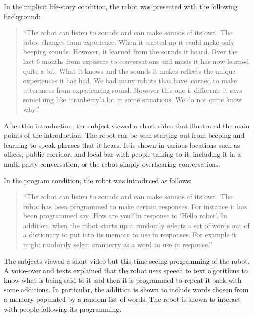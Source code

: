 In the implicit life-story condition, the robot was presented with the following background: 

\begin{quotation}

``The robot can listen to sounds and can make sounds of its own. The robot changes from experience. When it started up it could make only beeping sounds. However, it learned from the sounds it heard. Over the last 6 months from exposure to conversations and music it has now learned quite a bit. What it knows and the sounds it makes reflects the unique experiences it has had. We had many robots that have learned to make utterances from experiencing sound. However this one is different: it says something like \lq cranberry\rq a lot in some situations. We do not quite know why.'' 

\end{quotation}

After this introduction, the subject viewed a short video that illustrated the main points of the introduction. The robot can be seen starting out from beeping and learning to speak phrases that it hears. It is shown in various locations such as offices, public corridor, and local bar with people talking to it, including it in a multi-party conversation, or the robot simply overhearing conversations. 

In the program condition, the robot was introduced as follows:

\begin{quotation}

``The robot can listen to sounds and can make sounds of its own. The robot has been programmed to make certain responses. For instance it has been programmed say \lq How are you?\rq in response to \lq Hello robot\rq. In addition, when the robot starts up it randomly selects a set of words out of a dictionary to put into its memory to use in responses. For example it might randomly select cranberry as a word to use in response.''

\end{quotation}

The subjects viewed a short video but this time seeing programming of the robot. A voice-over and texts explained that the robot uses speech to text algorithms to know what is being said to it and then it is programmed to repeat it back with some additions. In particular, the addition is shown to include words chosen from a memory populated by a random list of words. The robot is shown to interact with people following its programming. 

